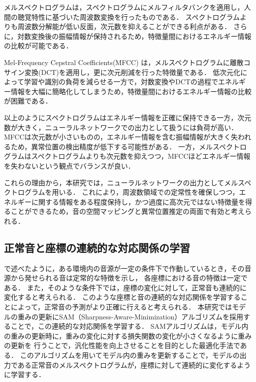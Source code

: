 \documentclass[../main]{subfiles}
\begin{document}
メルスペクトログラムは，スペクトログラムにメルフィルタバンクを適用し，人間の聴覚特性に基づいた周波数変換を行ったものである． スペクトログラムよりも周波数分解能が低い反面，次元数を抑えることができる利点がある． さらに，対数変換後の振幅情報が保持されるため，特徴量間におけるエネルギー情報の比較が可能である．

Mel-Frequency Cepstral Coefficients(MFCC) は，メルスペクトログラムに離散コサイン変換(DCT)を適用し，更に次元削減を行った特徴量である． 低次元化によって学習や識別の負荷を減らせる一方で，対数変換やDCTの過程でエネルギー情報を大幅に簡略化してしまうため，特徴量間におけるエネルギー情報の比較が困難である．


以上のようにスペクトログラムはエネルギー情報を正確に保持できる一方，次元数が大きく，ニューラルネットワークでの出力として扱うには負荷が高い． MFCCは次元数が小さいものの，エネルギー情報を含む振幅情報が大きく失われるため，異常位置の検出精度が低下する可能性がある． 一方，メルスペクトログラムはスペクトログラムよりも次元数を抑えつつ，MFCCほどエネルギー情報を失わないという観点でバランスが良い．

これらの理由から，本研究では，ニューラルネットワークの出力としてメルスペクトログラムを用いる． これにより，周波数領域での定常性を確保しつつ，エネルギーに関する情報をある程度保持し，かつ過度に高次元ではない特徴量を得ることができるため，音の空間マッピングと異常位置推定の両面で有効と考えられる．


\subsection{正常音と座標の連続的な対応関係の学習}
\label{sec:pmethod_sequential}
で述べたように，ある環境内の音源が一定の条件下で作動しているとき，その音源から発せられる音は定常的な特徴を示し，
各座標における音の特徴は一定である．
また，そのような条件下では，座標の変化に対して，正常音も連続的に変化すると考えられる．
このような座標と音の連続的な対応関係を学習することによって，正常音の予測がより正確に行えると考えられる．
本研究ではモデルの重みの更新にSAM（Sharpness-Aware-Minimization）アルゴリズムを採用することで，この連続的な対応関係を学習する\cite{sam}．
SAMアルゴリズムは，モデル内の重みの更新時に，重みの変化に対する損失関数の変化が小さくなるように重みの更新を
行うことで，汎化性能を向上させることを目的とした最適化手法である．
このアルゴリズムを用いてモデル内の重みを更新することで，モデルの出力である正常音のメルスペクトログラムが，座標に対して連続的に変化するように学習する．
\end{document}
